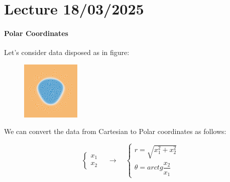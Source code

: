 \newpage

\chapter{Lecture 18/03/2025}




\subsubsection{Polar Coordinates}

Let's consider data disposed as in figure:

\begin{figure}[H]
    \centering
    \includegraphics[width=0.25\textwidth]{assets/polar.png}
    \label{fig:polar}
\end{figure}

We can convert the data from Cartesian to Polar coordinates as follows:

\begin{center}
    \begin{minipage}{0.4\textwidth}
    \end{minipage}
    \begin{minipage}{0.4\textwidth}
        $$
        \begin{cases}
            x_1 \\
            x_2
        \end{cases}
        \quad \rightarrow \quad
        \begin{cases}
            r = \sqrt{x_1^2 + x_2^2} \\
            \theta = arctg \dfrac{x_2}{x_1}
        \end{cases}
        $$
    \end{minipage}
\end{center}

